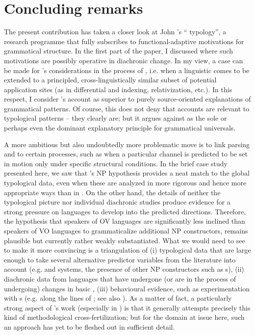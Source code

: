 \documentclass[output=paper]{langsci/langscibook}
\begin{document}
\section{Concluding remarks} 

The present contribution has taken a closer look at John ’s “ typology”, a research programme that fully subscribes to functional-adaptive motivations for grammatical structure. In the first part of the paper, I discussed where such motivations are possibly operative in diachronic change. In my view, a case can be made for ’s  considerations in the process of , i.e. when a linguistic  comes to be extended to a principled, cross-linguistically similar subset of potential application sites (as in differential  and indexing, relativization, etc.). In this respect, I consider ’s account as superior to purely source-oriented explanations of grammatical patterns. Of course, this does not deny that  accounts are relevant to typological patterns – they clearly are; but it argues against  as the sole or perhaps even the dominant explanatory principle for grammatical universals.

A more ambitious but also undoubtedly more problematic move is to link parsing and  to certain  processes, such as when a particular  channel is predicted to be set in motion only under specific structural conditions. In the brief case study presented here, we saw that ’s NP  hypothesis provides a neat match to the global typological data, even when these are analyzed in more rigorous and hence more appropriate ways than in \citet{Hawkins2014_VarEff}. On the other hand, the details of neither the typological picture nor individual diachronic studies produce evidence for a strong pressure on languages to develop into the predicted directions. Therefore, the hypothesis that speakers of OV languages are significantly less inclined than speakers of VO languages to grammaticalize additional NP constructors, remains plausible but currently rather weakly substantiated. 
\newpage
What we would need to see to make it more convincing is a triangulation of (i) typological data that are large enough to take several alternative predictor variables from the literature into account (e.g.  and  systems, the presence of other NP constructors such as s), (ii) diachronic data from languages that have undergone (or are in the process of undergoing) changes in basic , (iii) behavioural evidence, such as  experimentation with s (e.g. along the lines of \citealt{CulbertsonEtAl2012}; see also ). As a matter of fact, a particularly strong aspect of ’s work (especially in \citealt{Hawkins2004_Eff,Hawkins2014_VarEff}) is that it generally attempts precisely this kind of methodological cross-fertilization; but for the domain at issue here, such an approach has yet to be fleshed out in sufficient detail.
\end{document}
